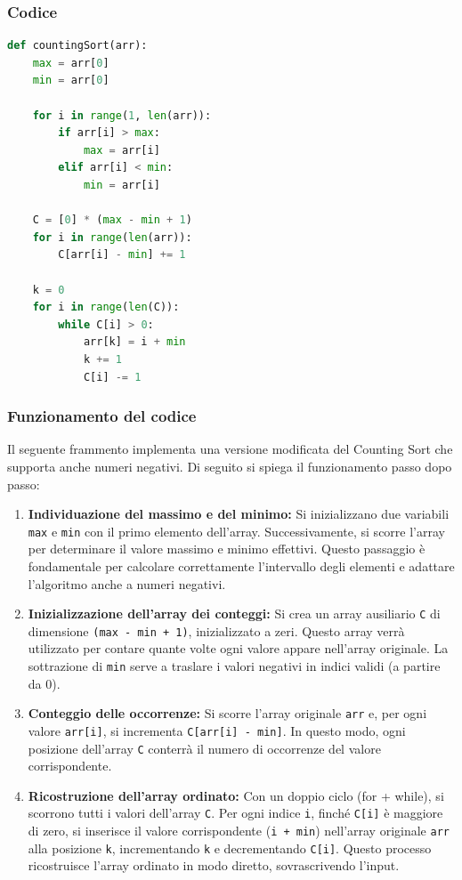 \documentclass[a4paper, 11pt]{article}
\begin{document}
\subsubsection*{Codice}
\begin{lstlisting}[style=mycodestyle, language=Python]
    def countingSort(arr):
    max = arr[0]
    min = arr[0]

    for i in range(1, len(arr)):
        if arr[i] > max:
            max = arr[i]
        elif arr[i] < min:
            min = arr[i]

    C = [0] * (max - min + 1)
    for i in range(len(arr)):
        C[arr[i] - min] += 1

    k = 0
    for i in range(len(C)):
        while C[i] > 0:
            arr[k] = i + min
            k += 1
            C[i] -= 1
\end{lstlisting}

\subsubsection*{Funzionamento del codice}

Il seguente frammento implementa una versione modificata del Counting Sort che supporta anche numeri negativi. Di seguito si spiega il funzionamento passo dopo passo:

\begin{enumerate}
  \item \textbf{Individuazione del massimo e del minimo:}  
  Si inizializzano due variabili \texttt{max} e \texttt{min} con il primo elemento dell'array. Successivamente, si scorre l'array per determinare il valore massimo e minimo effettivi. Questo passaggio è fondamentale per calcolare correttamente l’intervallo degli elementi e adattare l’algoritmo anche a numeri negativi.

  \item \textbf{Inizializzazione dell’array dei conteggi:}  
  Si crea un array ausiliario \texttt{C} di dimensione \texttt{(max - min + 1)}, inizializzato a zeri. Questo array verrà utilizzato per contare quante volte ogni valore appare nell’array originale. La sottrazione di \texttt{min} serve a traslare i valori negativi in indici validi (a partire da 0).

  \item \textbf{Conteggio delle occorrenze:}  
  Si scorre l’array originale \texttt{arr} e, per ogni valore \texttt{arr[i]}, si incrementa \texttt{C[arr[i] - min]}. In questo modo, ogni posizione dell’array \texttt{C} conterrà il numero di occorrenze del valore corrispondente.

  \item \textbf{Ricostruzione dell’array ordinato:}  
  Con un doppio ciclo (for + while), si scorrono tutti i valori dell’array \texttt{C}. Per ogni indice \texttt{i}, finché \texttt{C[i]} è maggiore di zero, si inserisce il valore corrispondente (\texttt{i + min}) nell’array originale \texttt{arr} alla posizione \texttt{k}, incrementando \texttt{k} e decrementando \texttt{C[i]}. Questo processo ricostruisce l’array ordinato in modo diretto, sovrascrivendo l’input.
\end{enumerate}
\end{document}

